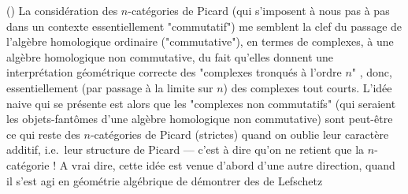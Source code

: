 \documentclass[11pt,a4paper]{article}
\begin{document}
() La considération des $n$-catégories de Picard 
(qui s'imposent à nous pas à pas dans un contexte essentiellement
"commutatif") me semblent la clef du passage de l'algèbre homologique ordinaire
("commutative"), en termes de complexes, à une algèbre homologique non
commutative, du fait qu'elles donnent une interprétation géométrique correcte
des "complexes tronqués à l'ordre $n$" , donc, essentiellement (par passage à la limite sur $n$) des
complexes tout courts. L'idée naive qui se présente est alors que les
"complexes non commutatifs" (qui seraient les objets-fantômes d'une algèbre
homologique non commutative) sont peut-être ce qui reste des $n$-catégories de
Picard (strictes) quand on oublie leur caractère additif, i.e.\ leur structure
de Picard — c'est à dire qu'on ne retient que la $n$-catégorie !
 A vrai dire, cette idée est venue d'abord d'une autre direction,
quand il s'est agi en géométrie algébrique de démontrer des 
 de Lefschetz

\end{document}
